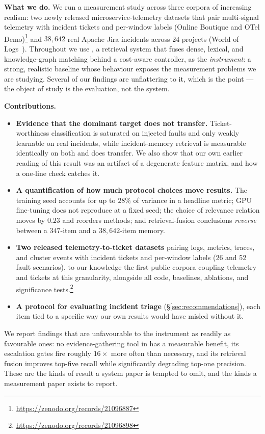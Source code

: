 \smallskip
\noindent\textbf{What we do.} We run a measurement study across three corpora of
increasing realism: two newly released microservice-telemetry datasets that pair
multi-signal telemetry with incident tickets and per-window labels (Online
Boutique and OTel Demo)\footnote{\url{https://zenodo.org/records/21096887}} and
$38{,}642$ real Apache Jira incidents across 24 projects (World of
Logs~\cite{wang2026worldoflogs}). Throughout we use \sys{}, a retrieval system
that fuses dense, lexical, and knowledge-graph matching behind a cost-aware
controller, as the \emph{instrument}: a strong, realistic baseline whose
behaviour exposes the measurement problems we are studying. Several of our findings
are unflattering to it, which is the point --- the object of study is the
evaluation, not the system.

\smallskip
\noindent\textbf{Contributions.}
\begin{itemize}
  \item \textbf{Evidence that the dominant target does not transfer.}
  Ticket-worthiness classification is saturated on injected faults and only
  weakly learnable on real incidents, while incident-memory retrieval is
  measurable identically on both and does transfer. We also show that our own
  earlier reading of this result was an artifact of a degenerate feature matrix,
  and how a one-line check catches it.

  \item \textbf{A quantification of how much protocol choices move results.}
  The training seed accounts for up to $28\%$ of variance in a headline metric;
  GPU fine-tuning does not reproduce at a fixed seed; the choice of relevance
  relation moves  by $0.23$ and reorders methods; and retrieval-fusion
  conclusions \emph{reverse} between a $347$-item and a $38{,}642$-item memory.

  \item \textbf{Two released telemetry-to-ticket datasets} pairing logs,
  metrics, traces, and cluster events with incident tickets and per-window
  labels (26 and 52 fault scenarios), to our knowledge the first public corpora
  coupling telemetry and tickets at this granularity, alongside all code,
  baselines, ablations, and significance
  tests.\footnote{\url{https://zenodo.org/records/21096898}}

  \item \textbf{A protocol for evaluating incident triage}
  (\S\ref{sec:recommendations}), each item tied to a specific way our own
  results would have misled without it.
\end{itemize}

\noindent We report findings that are unfavourable to the instrument as
readily as favourable ones: no evidence-gathering tool in \sys{} has a
measurable benefit, its escalation gates fire roughly $16\times$ more often than
necessary, and its retrieval fusion improves top-five recall while
significantly degrading top-one precision. These are the kinds of result a
system paper is tempted to omit, and the kinds a measurement paper exists to
report.
